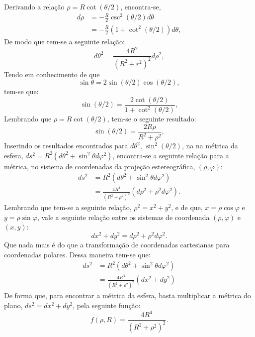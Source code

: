 Derivando a relação $\rho = R\cot(\theta/2)$, encontra-se,
%
\begin{align}
\nonumber d\rho &= - \frac{R}{2}\csc^2(\theta/2)d\theta \\ 
                &= - \frac{R}{2}(1 + \cot^2(\theta/2))d\theta,
\end{align}
%
De modo que tem-se a seguinte relação:
%
\begin{equation}
d\theta^2 = \frac{4R^2}{(R^2 + r^2)^2}d\rho^2,
\end{equation}
%
Tendo em conhecimento de que
%
\begin{equation}
\sin\theta = 2\sin(\theta/2)\cos(\theta/2),
\end{equation}
%
tem-se que:
%
\begin{equation}
\sin(\theta/2) = \frac{2\cot(\theta/2)}{1 + \cot^2(\theta/2)},
\end{equation}
%
Lembrando que $\rho = R\cot(\theta/2)$, tem-se o seguinte resultado:
%
\begin{equation}
\sin(\theta/2) = \frac{2R\rho}{R^2 + \rho^2},
\end{equation}
%
Inserindo os resultados encontrados para $d\theta^2$, $\sin^2(\theta/2)$, 
na na métrica da esfera, $ds^2 = R^2(d\theta^2 + \sin^2\theta d\varphi^2)$, 
encontra-se a seguinte relação para a métrica, no sistema de coordenadas 
da projeção estereográfica, $(\rho,\varphi)$:
%
\begin{align}
\nonumber ds^2 &= R^2(d\theta^2 + \sin^2\theta d\varphi^2) \\
               &= \frac{4R^4}{(R^2 + \rho^2)^2}(d\rho^2 + 
     \rho^2 d\varphi^2).
\end{align}
%
Lembrando que tem-se a seguinte relação, $\rho^2 = x^2 + y^2$, e de que, 
$x = \rho\cos\varphi$ e $y = \rho\sin\varphi$, vale a seguinte relação 
entre os sistemas de coordenada $(\rho,\varphi)$ e $(x,y)$:
%
\begin{equation}
dx^2 + dy^2 = d\rho^2 + \rho^2 d\varphi^2.
\end{equation}
%
Que nada mais é do que a transformação de coordenadas cartesianas para 
coordenadas polares. Dessa maneira tem-se que:
%
\begin{align}
\nonumber ds^2 &= R^2(d\theta^2 + \sin^2\theta d\varphi^2) 
\\ 
               &= \frac{4R^4}{(R^2 + \rho^2)^2}(dx^2 + dy^2)
\end{align}
%
De forma que, para encontrar a métrica da esfera, basta multiplicar 
a métrica do plano, $ds^2 = dx^2 + dy^2$, pela seguinte função:
%
\begin{equation}
f(\rho,R) = \frac{4R^4}{(R^2 + \rho^2)^2}.
\end{equation}
